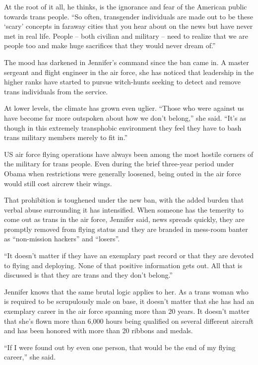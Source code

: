 At the root of it all, he thinks, is the ignorance and fear of the American public towards trans people. “So often, transgender individuals are made out to be these ‘scary’ concepts in faraway cities that you hear about on the news but have never met in real life. People – both civilian and military – need to realize that we are people too and make huge sacrifices that they would never dream of.”

The mood has darkened in Jennifer’s command since the ban came in. A master sergeant and flight engineer in the air force, she has noticed that leadership in the higher ranks have started to pursue witch-hunts seeking to detect and remove trans individuals from the service.

At lower levels, the climate has grown even uglier. “Those who were against us have become far more outspoken about how we don’t belong,” she said. “It’s as though in this extremely transphobic environment they feel they have to bash trans military members merely to fit in.”

US air force flying operations have always been among the most hostile corners of the military for trans people. Even during the brief three-year period under Obama when restrictions were generally loosened, being outed in the air force would still cost aircrew their wings.

That prohibition is toughened under the new ban, with the added burden that verbal abuse surrounding it has intensified. When someone has the temerity to come out as trans in the air force, Jennifer said, news spreads quickly, they are promptly removed from flying status and they are branded in mess-room banter as “non-mission hackers” and “losers”.

“It doesn’t matter if they have an exemplary past record or that they are devoted to flying and deploying. None of that positive information gets out. All that is discussed is that they are trans and they don’t belong.”

Jennifer knows that the same brutal logic applies to her. As a trans woman who is required to be scrupulously male on base, it doesn’t matter that she has had an exemplary career in the air force spanning more than 20 years. It doesn’t matter that she’s flown more than 6,000 hours being qualified on several different aircraft and has been honored with more than 20 ribbons and medals.

“If I were found out by even one person, that would be the end of my flying career,” she said.

